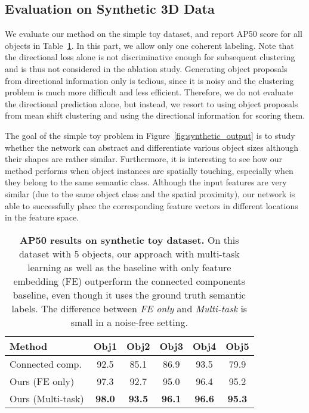 \documentclass[10pt,twocolumn,letterpaper]{article}
\begin{document}
\subsection{Evaluation on Synthetic 3D Data}





We evaluate our method on the simple toy dataset, and report AP50 score for all objects in Table~\ref{tab:results_synth}.
In this part, we allow only one coherent labeling.
Note that the directional loss alone is not discriminative enough for subsequent clustering and is thus not considered in the ablation study.
Generating object proposals from directional information only is tedious, since it is noisy and the clustering problem is much more difficult and less efficient. 
Therefore, we do not evaluate the directional prediction alone, but instead, we resort to using object proposals from mean shift clustering and using the directional information for scoring them.

The goal of the simple toy problem in Figure~\ref{fig:synthetic_output} is to study whether the network can abstract and differentiate various object sizes although their shapes are rather similar. 
Furthermore, it is interesting to see how our method performs when object instances are spatially touching, especially when they belong to the same semantic class. 
Although the input features are very similar (due to the same object class and the spatial proximity), our network is able to successfully place the corresponding feature vectors in different locations in the feature space.
\begin{table}[tb!]
\centering
\vspace{6pt}
\begin{tabular}{l|ccccc}
\hline
Method & Obj1 & Obj2 & Obj3 & Obj4 & Obj5\\
\hline
\hline
Connected comp. & 92.5 & 85.1 & 86.9 & 93.5 & 79.9 \\
Ours (FE only) & 97.3 & 92.7 & 95.0 & 96.4 & 95.2\\
Ours (Multi-task) & \textbf{98.0} & \textbf{93.5} & \textbf{96.1} & \textbf{96.6} & \textbf{95.3}\\
\hline
\end{tabular}
\vspace{0.01cm}
\caption{\textbf{AP50 results on synthetic toy dataset.} On this dataset with 5 objects, our approach with multi-task learning as well as the baseline with only feature embedding (FE) outperform the connected components baseline, even though it uses the ground truth semantic labels. The difference between \textit{FE only} and \textit{Multi-task} is small in a noise-free setting.}
\label{tab:results_synth}
\vspace{5pt}
\end{table}
\end{document}
